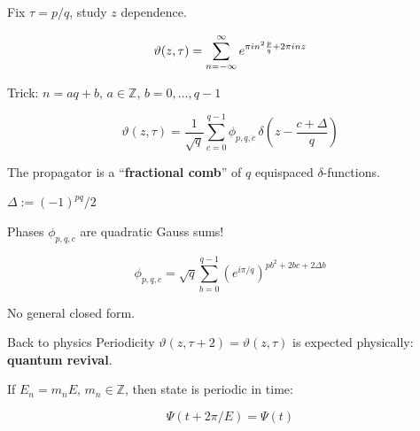 \documentclass{beamer}
\begin{document}
\begin{frame}
    Fix $\tau = p/q$, study $z$ dependence.

    \begin{equation}
        \vartheta(z,\tau) = \sum_{n=-\infty}^\infty e^{\pi i n^2 \frac{p}{q} + 2\pi i n z}
        \label{}
    \end{equation}

    Trick: $n = aq + b$, $a \in \mathbb{Z}$, $b = 0,\ldots,q-1$

\begin{equation}
    \vartheta(z,\tau) = \frac{1}{\sqrt q} \sum_{c=0}^{q-1} \phi_{p,q,c} \, \delta\left(z - \frac{c+\Delta}{q}\right)
    \label{}
\end{equation}


The propagator is a ``\textbf{fractional comb}'' of $q$ equispaced $\delta$-functions.

\vfill

{\small $\Delta := (-1)^{pq}/2$}

\end{frame}

\begin{frame}

Phases $\phi_{p,q,c}$ are quadratic Gauss sums!

\begin{equation}
    \phi_{p,q,c} = \sqrt{q} \sum_{b=0}^{q-1} (e^{i\pi/q})^{pb^2 + 2bc + 2\Delta b}
    \label{}
\end{equation}

No general closed form.

\end{frame}

\begin{frame}{Back to physics}
    Periodicity $\vartheta(z,\tau + 2) = \vartheta(z,\tau)$ is expected physically: \textbf{quantum revival}.

   \vfill

    If $E_n = m_n E$, $m_n \in \mathbb{Z}$, then state is periodic in time:

    \begin{equation}\Psi(t + 2\pi/E) = \Psi(t)\end{equation}

\end{frame}
\end{document}
